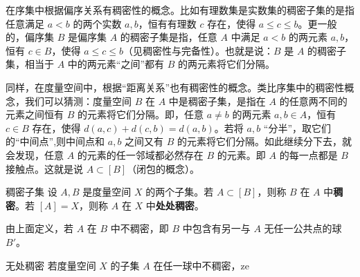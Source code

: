 
在序集中根据偏序关系有稠密性的概念。比如有理数集是实数集的稠密子集的是指任意满足 $a<b$ 的两个实数 $a,b$，恒有有理数 $c$ 存在，使得 $a\leq c\leq b$。更一般的，偏序集 $B$ 是偏序集 $A$ 的稠密子集是指，任意 $A$ 中满足 $a<b$ 的两元素 $a,b$，恒有 $c\in B$，使得 $a\leq c\leq b$（见稠密性与完备性）。也就是说：$B$ 是 $A$ 的稠密子集，相当于 $A$ 中的两元素“之间”都有 $B$ 的两元素将它们分隔。

同样，在度量空间中，根据“距离关系”也有稠密性的概念。类比序集中的稠密性概念，我们可以猜测：度量空间 $B$ 在 $A$ 中是稠密子集，是指在 $A$ 的任意两不同的元素之间恒有 $B$ 的元素将它们分隔。即，任意 $a\neq b$ 的两元素 $a,b\in A$，恒有 $c\in B$ 存在，使得 $d(a,c)+d(c,b)=d(a,b)$。若将 $a,b$ “分半”，取它们的“中间点”,则中间点和 $a,b$ 之间又有 $B$ 的元素将它们分隔。如此继续分下去，就会发现，任意 $A$ 的元素的任一邻域都必然存在 $B$ 的元素。即 $A$ 的每一点都是 $B$ 接触点。这就是说 $A\subset [B]$（闭包的概念）。

\begin{definition}{稠密子集}
设 $A,B$ 是度量空间 $X$ 的两个子集。若 $A\subset [B]$，则称 $B$ 在 $A$ 中\textbf{稠密}。若 $[A]=X$，则称 $A$ 在 $X$ 中\textbf{处处稠密}。
\end{definition}

由上面定义，若 $A$ 在 $B$ 中不稠密，即 $B$ 中包含有另一与 $A$ 无任一公共点的球 $B'$。
\begin{definition}{无处稠密}
若度量空间 $X$ 的子集 $A$ 在任一球中不稠密，ze
\end{definition}


